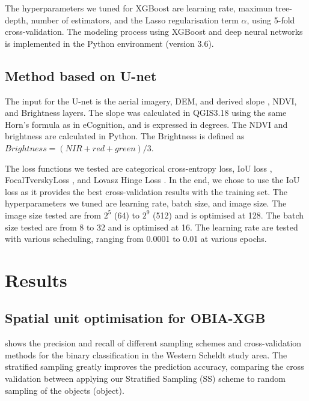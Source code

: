 \documentclass{isprs} %
\begin{document}
The hyperparameters we tuned for XGBoost are learning rate, maximun tree-depth, number of estimators, and the Lasso regularisation term $\alpha$, using 5-fold cross-validation. The modeling process using XGBoost and deep neural networks is implemented in the Python environment (version 3.6). 

\subsection{Method based on U-net}

The input for the U-net is the aerial imagery, DEM, and derived slope \citep{horn1981hill}, NDVI, and  Brightness layers. The slope was calculated in QGIS3.18 using the same Horn's formula \citep{horn1981hill} as in eCognition, and is expressed in degrees. The NDVI and brightness are calculated in Python. The Brightness is defined as $Brightness =  (NIR+red+green)/3$.
 
The loss functions we tested are categorical cross-entropy loss, IoU loss \citep{van2019deep}, FocalTverskyLoss \citep{abraham2019novel}, and Lovasz Hinge Loss \citep{berman2018lovasz}. In the end, we chose to use the IoU loss as it provides the best cross-validation results with the training set. The hyperparameters we tuned are learning rate, batch size, and image size. The image size tested are from $2^5$ (64) to $2^9$ (512) and is optimised at 128. The batch size tested are from 8 to 32 and is optimised at 16. The learning rate are tested with various scheduling, ranging from 0.0001 to 0.01 at various epochs. 
 

\section{Results}
\label{sec:results}

\subsection{Spatial unit optimisation for OBIA-XGB}
\label{sec:suo}

  shows the precision and recall of different sampling schemes and cross-validation methods for the binary classification in the Western Scheldt study area. The stratified sampling greatly improves the prediction accuracy, comparing the cross validation between applying our Stratified Sampling (SS) scheme to random sampling of the objects (object).
 
\end{document}

